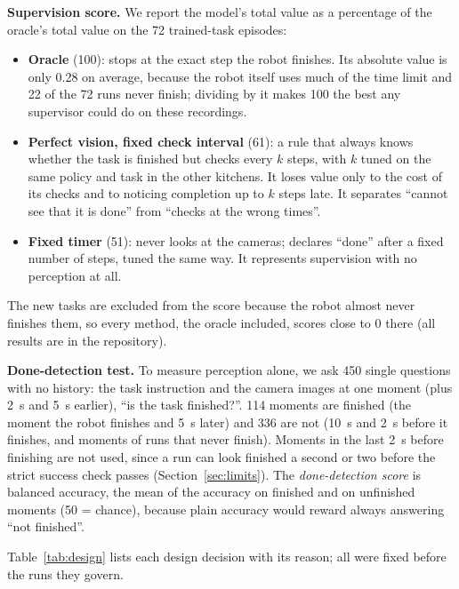\documentclass[10pt,twocolumn,letterpaper]{article}
\begin{document}
\textbf{Supervision score.} We report the model's total value as a percentage of the oracle's total value on the
72 trained-task episodes:
\begin{itemize}
\item \textbf{Oracle} (100): stops at the exact step the robot finishes. Its absolute value is only 0.28 on average,
because the robot itself uses much of the time limit and 22 of the 72 runs never finish; dividing by it makes 100
the best any supervisor could do on these recordings.
\item \textbf{Perfect vision, fixed check interval} (61): a rule that always knows whether the task is finished but
checks every $k$ steps, with $k$ tuned on the same policy and task in the other kitchens. It loses value only to the
cost of its checks and to noticing completion up to $k$ steps late. It separates ``cannot see that it is done''
from ``checks at the wrong times''.
\item \textbf{Fixed timer} (51): never looks at the cameras; declares ``done'' after a fixed number of steps, tuned the
same way. It represents supervision with no perception at all.
\end{itemize}
The new tasks are excluded from the score because the robot almost never finishes them, so every method, the oracle
included, scores close to 0 there (all results are in the repository).

\textbf{Done-detection test.} To measure perception alone, we ask 450 single questions with no history: the task
instruction and the camera images at one moment (plus 2~s and 5~s earlier), ``is the task finished?''. 114 moments
are finished (the moment the robot finishes and 5~s later) and 336 are not (10~s and 2~s before it finishes, and
moments of runs that never finish). Moments in the last 2~s before finishing are not used, since a run can look
finished a second or two before the strict success check passes (Section~\ref{sec:limits}). The \emph{done-detection score} is balanced accuracy, the mean of the accuracy on
finished and on unfinished moments (50 = chance), because plain accuracy would reward always answering ``not
finished''.

Table~\ref{tab:design} lists each design decision with its reason; all were fixed before the runs they govern.
\end{document}
